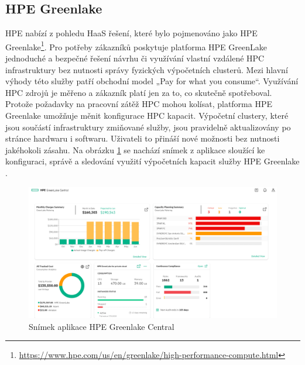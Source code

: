 \subsection{HPE Greenlake}
HPE nabízí z pohledu HaaS řešení, které bylo pojmenováno jako HPE Greenlake\footnote{\href{https://www.hpe.com/us/en/greenlake/high-performance-compute.html}{https://www.hpe.com/us/en/greenlake/high-performance-compute.html}}. Pro potřeby zákazníků poskytuje platforma HPE GreenLake jednoduché a bezpečné řešení návrhu či využívání vlastní vzdálené HPC infrastruktury bez nutnosti správy fyzických výpočetních clusterů. Mezi hlavní výhody této služby patří obchodní model „Pay for what you consume“. Využívání HPC zdrojů je měřeno a zákazník platí jen za to, co skutečně spotřeboval. Protože požadavky na pracovní zátěž HPC mohou kolísat, platforma HPE Greenlake umožňuje měnit konfigurace HPC kapacit. Výpočetní clustery, které jsou součástí infrastruktury zmiňované služby, jsou pravidelně aktualizovány po stránce hardwaru i softwaru. Uživateli to přináší nové možnosti bez nutnosti jakéhokoli zásahu. Na obrázku \ref{fig:greenlake} se nachází snímek z aplikace sloužící ke konfiguraci, správě a sledování využití výpočetních kapacit služby HPE Greenlake \cite{IN09sfzqoa3sLbg4}.

\begin{figure}[!h]
	\centering
	\includegraphics[width=1\textwidth]{Figures/hpe-greenlake-central.png}
	\caption{Snímek aplikace HPE Greenlake Central \cite{Showalter20200616}}
	\label{fig:greenlake}
\end{figure}
\newpage

